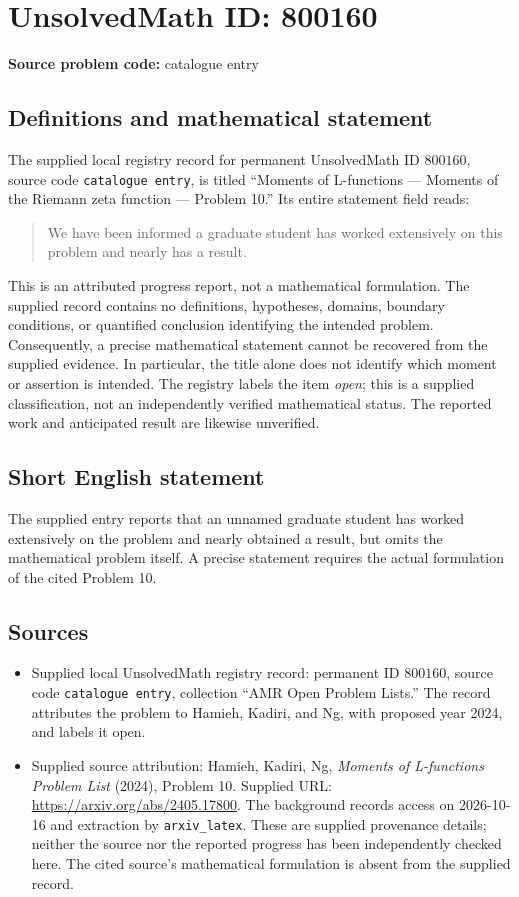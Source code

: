 \documentclass[11pt]{article}
\begin{document}
\section*{UnsolvedMath ID: 800160}
\textbf{Source problem code:} catalogue entry
\subsection{Definitions and mathematical statement}
The supplied local registry record for permanent UnsolvedMath ID \(800160\), source code \texttt{catalogue entry}, is titled ``Moments of L-functions --- Moments of the Riemann zeta function --- Problem 10.'' Its entire statement field reads:
\begin{quote}
We have been informed a graduate student has worked extensively on this problem and nearly has a result.
\end{quote}
This is an attributed progress report, not a mathematical formulation. The supplied record contains no definitions, hypotheses, domains, boundary conditions, or quantified conclusion identifying the intended problem. Consequently, a precise mathematical statement cannot be recovered from the supplied evidence. In particular, the title alone does not identify which moment or assertion is intended. The registry labels the item \emph{open}; this is a supplied classification, not an independently verified mathematical status. The reported work and anticipated result are likewise unverified.
\subsection{Short English statement}
The supplied entry reports that an unnamed graduate student has worked extensively on the problem and nearly obtained a result, but omits the mathematical problem itself. A precise statement requires the actual formulation of the cited Problem 10.
\subsection{Sources}
\begin{itemize}
\item Supplied local UnsolvedMath registry record: permanent ID \(800160\), source code \texttt{catalogue entry}, collection ``AMR Open Problem Lists.'' The record attributes the problem to Hamieh, Kadiri, and Ng, with proposed year 2024, and labels it open.
\item Supplied source attribution: Hamieh, Kadiri, Ng, \emph{Moments of L-functions Problem List} (2024), Problem 10. Supplied URL: \url{https://arxiv.org/abs/2405.17800}. The background records access on 2026-10-16 and extraction by \texttt{arxiv\_latex}. These are supplied provenance details; neither the source nor the reported progress has been independently checked here. The cited source's mathematical formulation is absent from the supplied record.
\end{itemize}
\end{document}
